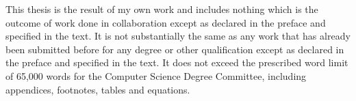 
\begin{declaration}


This thesis is the result of my own work and includes nothing which is the outcome of work done in collaboration except as declared in the preface and specified in the text.
It is not substantially the same as any work that has already been submitted before for any degree or other qualification except as declared in the preface and specified in the text.
It does not exceed the prescribed word limit of 65,000 words for the Computer Science Degree Committee, including appendices, footnotes, tables and equations. 


\end{declaration}


